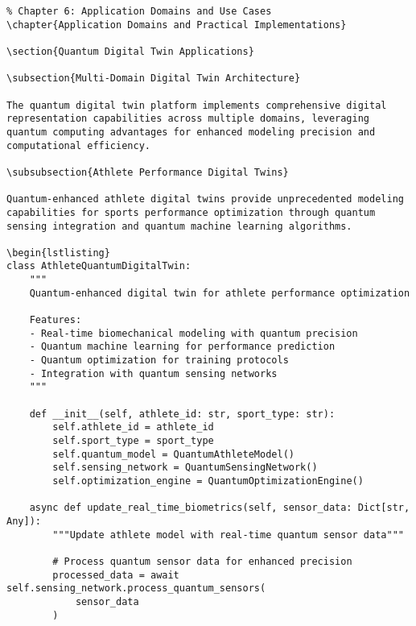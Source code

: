 \documentclass[12pt,a4paper]{report}
\begin{document}
\begin{lstlisting}
% Chapter 6: Application Domains and Use Cases
\chapter{Application Domains and Practical Implementations}

\section{Quantum Digital Twin Applications}

\subsection{Multi-Domain Digital Twin Architecture}

The quantum digital twin platform implements comprehensive digital representation capabilities across multiple domains, leveraging quantum computing advantages for enhanced modeling precision and computational efficiency.

\subsubsection{Athlete Performance Digital Twins}

Quantum-enhanced athlete digital twins provide unprecedented modeling capabilities for sports performance optimization through quantum sensing integration and quantum machine learning algorithms.

\begin{lstlisting}
class AthleteQuantumDigitalTwin:
    """
    Quantum-enhanced digital twin for athlete performance optimization

    Features:
    - Real-time biomechanical modeling with quantum precision
    - Quantum machine learning for performance prediction
    - Quantum optimization for training protocols
    - Integration with quantum sensing networks
    """

    def __init__(self, athlete_id: str, sport_type: str):
        self.athlete_id = athlete_id
        self.sport_type = sport_type
        self.quantum_model = QuantumAthleteModel()
        self.sensing_network = QuantumSensingNetwork()
        self.optimization_engine = QuantumOptimizationEngine()

    async def update_real_time_biometrics(self, sensor_data: Dict[str, Any]):
        """Update athlete model with real-time quantum sensor data"""

        # Process quantum sensor data for enhanced precision
        processed_data = await self.sensing_network.process_quantum_sensors(
            sensor_data
        )


\end{lstlisting}
\end{document}
